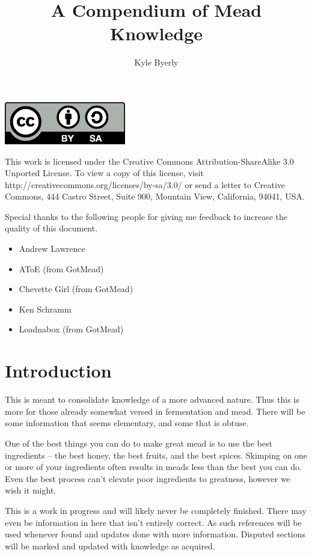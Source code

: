 \documentclass{article}
\title{A Compendium of Mead Knowledge}
\author{
  Kyle Byerly\\
}
\begin{document}
\maketitle
\newpage

\begin{center}
\includegraphics{by-sa.pdf}
\end{center}
This work is licensed under the Creative Commons Attribution-ShareAlike 3.0 Unported License. 
To view a copy of this license, visit http://creativecommons.org/licenses/by-sa/3.0/ or send 
a letter to Creative Commons, 444 Castro Street, Suite 900, Mountain View, California, 94041, USA.

\newpage

Special thanks to the following people for giving me feedback to increase the quality of this document.

\begin{itemize}
\item Andrew Lawrence
\item AToE (from GotMead)
\item Chevette Girl (from GotMead)
\item Ken Schramm
\item Loadnabox (from GotMead)
\end{itemize}


\newpage

\tableofcontents
\newpage

\section{Introduction}
 This is meant to consolidate knowledge of a more advanced nature. Thus this is more for those already somewhat 
 versed in fermentation and mead. There will be some information that seems elementary, and some that is obtuse.
 
 One of the best things you can do to make great mead is to use the best ingredients -- the best honey, the best 
 fruits, and the best spices. Skimping on one or more of your ingredients often results in meads less than the 
 best you can do. Even the best process can't elevate poor ingredients to greatness, however we wish it might.

 This is a work in progress and will likely never be completely finished. There may even be information in
 here that isn't entirely correct. As such references will be used whenever found and updates done with more 
 information. Disputed sections will be marked and updated with knowledge as acquired.
\end{document}
